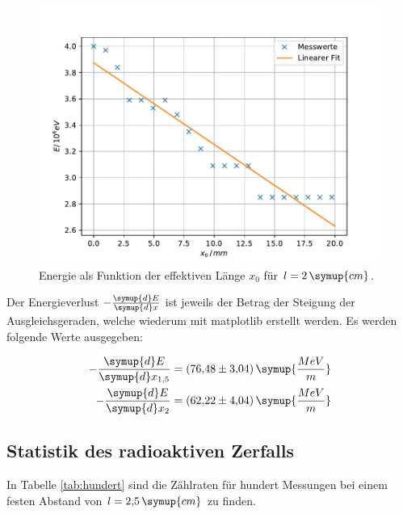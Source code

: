 \begin{figure}[h!tbp]
	\centering
	\includegraphics[width=0.8\linewidth]{energie_weglaenge2.pdf}
	\caption{Energie als Funktion der effektiven Länge $x_0$ für $l=2\,\symup{cm}$.}
	\label{fig:energie2}
\end{figure}

Der Energieverlust $-\frac{\symup{d}E}{\symup{d}x}$ ist jeweils der Betrag der Steigung der Ausgleichsgeraden, welche wiederum mit matplotlib erstellt werden.
Es werden folgende Werte ausgegeben:

\begin{equation*}
\begin{aligned}
-\frac{\symup{d}E}{\symup{d}x_{1{,}5}} &= (76{,}48 \pm 3{,}04)\,\symup{\frac{MeV}{m}} \\
-\frac{\symup{d}E}{\symup{d}x_2} &= (62{,}22 \pm 4{,}04)\,\symup{\frac{MeV}{m}} \\
\end{aligned}
\end{equation*}




\subsection{Statistik des radioaktiven Zerfalls}
In Tabelle \ref{tab:hundert} sind die Zählraten für hundert Messungen bei einem festen Abstand von $l = 2{,}5\,\symup{cm}$ zu finden.


